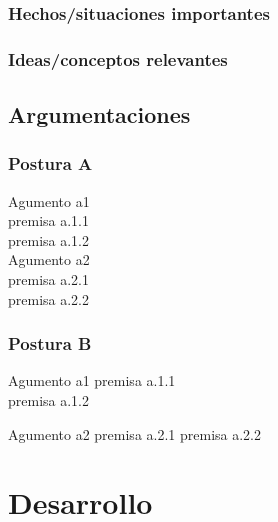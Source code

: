 \documentclass[12pt, twoside]{article}
\begin{document}
\subsubsection{Hechos/situaciones importantes}%

\subsubsection{Ideas/conceptos relevantes}%


\subsection{Argumentaciones}%

\subsubsection{Postura A}%

Agumento a1\\
premisa a.1.1\\
premisa a.1.2\\
Agumento a2\\
premisa a.2.1\\
premisa a.2.2

\subsubsection{Postura B}%

Agumento a1
premisa a.1.1\\
premisa a.1.2

Agumento a2
premisa a.2.1
premisa a.2.2
\fi
\section{Desarrollo}%
\label{sec:Desarrollo}
\end{document}
